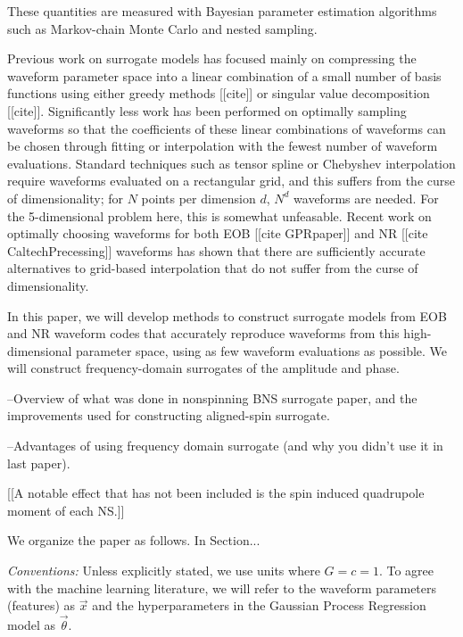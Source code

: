 \documentclass[prd,aps,letter,twocolumn,floatfix,notitlepage]{revtex4-1}
\begin{document}
These quantities are measured with Bayesian parameter estimation algorithms such as Markov-chain Monte Carlo and nested sampling.

Previous work on surrogate models has focused mainly on compressing the waveform parameter space into a linear combination of a small number of basis functions using either greedy methods [[cite]] or singular value decomposition [[cite]]. Significantly less work has been performed on optimally sampling waveforms so that the coefficients of these linear combinations of waveforms can be chosen through fitting or interpolation with the fewest number of waveform evaluations. Standard techniques such as tensor spline or Chebyshev interpolation require waveforms evaluated on a rectangular grid, and this suffers from the curse of dimensionality; for $N$ points per dimension $d$,  $N^d$ waveforms are needed. For the 5-dimensional problem here, this is somewhat unfeasable. Recent work on optimally choosing waveforms for both EOB [[cite GPRpaper]] and NR [[cite CaltechPrecessing]] waveforms has shown that there are sufficiently accurate alternatives to grid-based interpolation that do not suffer from the curse of dimensionality.

In this paper, we will develop methods to construct surrogate models from EOB and NR waveform codes that accurately reproduce waveforms from this high-dimensional parameter space, using as few waveform evaluations as possible. We will construct frequency-domain surrogates of the amplitude and phase.


--Overview of what was done in nonspinning BNS surrogate paper, and the improvements used for constructing aligned-spin surrogate. 

--Advantages of using frequency domain surrogate (and why you didn't use it in last paper).


[[A notable effect that has not been included is the spin induced quadrupole moment of each NS.]] 


We organize the paper as follows. In Section...

\textit{Conventions:} Unless explicitly stated, we use units where $G=c=1$. To agree with the machine learning literature, we will refer to the waveform parameters (features) as $\vec x$ and the hyperparameters in the Gaussian Process Regression model as $\vec\theta$.

\end{document}
